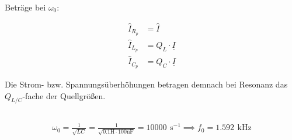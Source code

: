 \documentclass[a4paper, 12pt]{article}
\begin{document}
    Beträge bei $\omega_0$:

    \begin{align*}
      \hat{I}_{R_p} &= \hat{I}\\
      \hat{I}_{L_p} &= Q_L \cdot \underline{I}\\
      \hat{I}_{C_p} &= Q_C \cdot \underline{I}
    \end{align*}

    Die Strom- bzw. Spannungsüberhöhungen betragen demnach bei Resonanz das $Q_{L/C}$-fache der Quellgrößen.

  \subsection{}
  \begin{gather*}
    \omega_0 = \frac{1}{\sqrt{LC}} = \frac{1}{\sqrt{0.1 \si{\henry} \cdot 100 \si{\nano\farad}}} = 10000 \,\ \si{\second}^{-1} \implies f_0 = 1.592 \,\ \si{\kilo\hertz}
  \end{gather*}

  \vspace{0.013155617496424828\paperheight}
\end{document}
